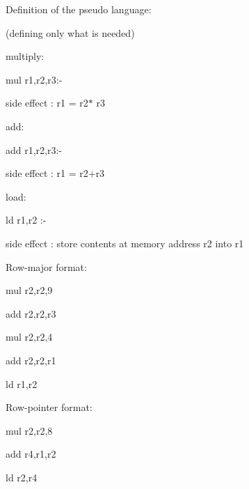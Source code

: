 \documentclass[12pt]{article}
\renewcommand{\_}{\kern-1.5pt\textunderscore\kern-1.5pt}
\begin{document}
\vspace{\baselineskip}
Definition of the pseudo language:\par

(defining only what is needed)\par


\vspace{\baselineskip}
multiply:\par

mul r1,r2,r3:-\par

side effect : r1 = r2$\ast$ r3\par


\vspace{\baselineskip}
add:\par

add r1,r2,r3:-\par

side effect : r1 = r2+r3\par


\vspace{\baselineskip}
load:\par

ld r1,r2 :-\par

side effect : store contents at memory address r2 into r1\par


\vspace{\baselineskip}
Row-major format:\par


\vspace{\baselineskip}
mul r2,r2,9\par

add r2,r2,r3\par

mul r2,r2,4\par

add r2,r2,r1\par

ld r1,r2\par


\vspace{\baselineskip}
Row-pointer format:\par


\vspace{\baselineskip}
mul r2,r2,8\par

add r4,r1,r2\par

ld r2,r4\par
\end{document}
